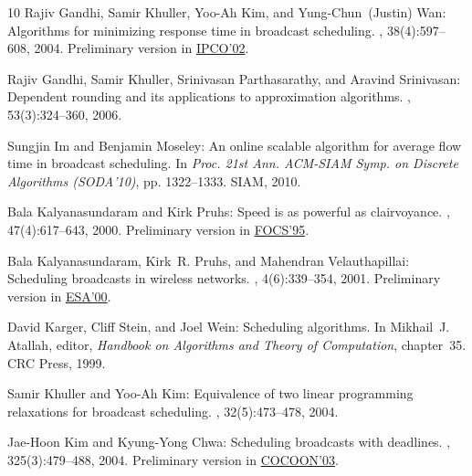 \begin{thebibliography}{10}
{\sc Rajiv Gandhi, Samir Khuller, Yoo-Ah Kim, and Yung-Chun~(Justin) Wan}:
  Algorithms for minimizing response time in broadcast scheduling.
, 38(4):597--608, 2004.
\newblock Preliminary version in
  \href{https://dl.acm.org/citation.cfm?id=660079}{IPCO'02}.
\newblock [\epfmtdoi{10.1007/s00453-003-1058-x}]

{\sc Rajiv Gandhi, Samir Khuller, Srinivasan Parthasarathy, and Aravind
  Srinivasan}: Dependent rounding and its applications to approximation
  algorithms.
, 53(3):324--360, 2006.
\newblock [\epfmtdoi{10.1145/1147954.1147956}]

{\sc Sungjin Im and Benjamin Moseley}: An online scalable algorithm for average
  flow time in broadcast scheduling.
\newblock In {\em Proc. 21st Ann. ACM-SIAM Symp. on Discrete Algorithms
  (SODA'10)}, pp. 1322--1333. SIAM, 2010.

{\sc Bala Kalyanasundaram and Kirk Pruhs}: Speed is as powerful as
  clairvoyance.
, 47(4):617--643, 2000.
\newblock Preliminary version in
  \href{http://dx.doi.org/10.1109/SFCS.1995.492478}{FOCS'95}.
\newblock [\epfmtdoi{10.1145/347476.347479}]

{\sc Bala Kalyanasundaram, Kirk~R. Pruhs, and Mahendran Velauthapillai}:
  Scheduling broadcasts in wireless networks.
, 4(6):339--354, 2001.
\newblock Preliminary version in
  \href{http://dx.doi.org/10.1007/3-540-45253-2\_27}{ESA'00}.

{\sc David Karger, Cliff Stein, and Joel Wein}: Scheduling algorithms.
\newblock In {\sc Mikhail~J. Atallah}, editor, {\em Handbook on Algorithms and
  Theory of Computation}, chapter~35. CRC Press, 1999.
\newblock [\epfmtdoi{10.1201/9781420049503-c36}]

{\sc Samir Khuller and Yoo-Ah Kim}: Equivalence of two linear programming
  relaxations for broadcast scheduling.
, 32(5):473--478, 2004.

{\sc Jae-Hoon Kim and Kyung-Yong Chwa}: Scheduling broadcasts with deadlines.
, 325(3):479--488, 2004.
\newblock Preliminary version in
  \href{http://dx.doi.org/10.1007/3-540-45071-8_42}{COCOON'03}.


\end{thebibliography}
